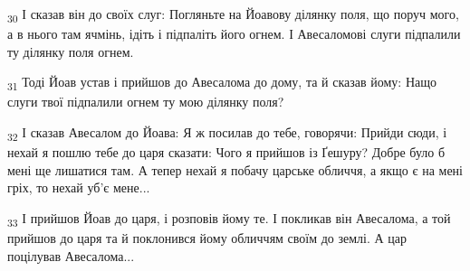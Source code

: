 \begin{tcolorbox}
\textsubscript{30} І сказав він до своїх слуг: Погляньте на Йоавову ділянку поля, що поруч мого, а в нього там ячмінь, ідіть і підпаліть його огнем. І Авесаломові слуги підпалили ту ділянку поля огнем.
\end{tcolorbox}
\begin{tcolorbox}
\textsubscript{31} Тоді Йоав устав і прийшов до Авесалома до дому, та й сказав йому: Нащо слуги твої підпалили огнем ту мою ділянку поля?
\end{tcolorbox}
\begin{tcolorbox}
\textsubscript{32} І сказав Авесалом до Йоава: Я ж посилав до тебе, говорячи: Прийди сюди, і нехай я пошлю тебе до царя сказати: Чого я прийшов із Ґешуру? Добре було б мені ще лишатися там. А тепер нехай я побачу царське обличчя, а якщо є на мені гріх, то нехай уб'є мене...
\end{tcolorbox}
\begin{tcolorbox}
\textsubscript{33} І прийшов Йоав до царя, і розповів йому те. І покликав він Авесалома, а той прийшов до царя та й поклонився йому обличчям своїм до землі. А цар поцілував Авесалома...
\end{tcolorbox}
